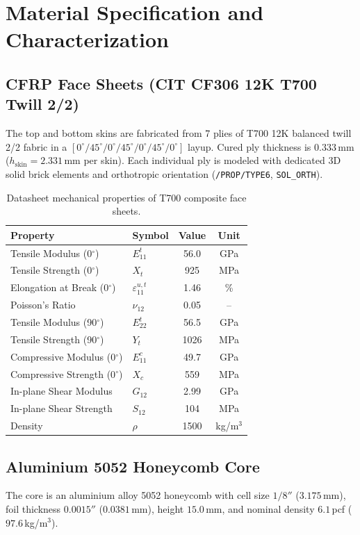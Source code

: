 \documentclass[11pt,a4paper]{article}
\begin{document}
\section{Material Specification and Characterization}
\subsection{CFRP Face Sheets (CIT CF306 12K T700 Twill 2/2)}
The top and bottom skins are fabricated from 7 plies of T700 12K balanced twill 2/2 fabric in a $[0^\circ/45^\circ/0^\circ/45^\circ/0^\circ/45^\circ/0^\circ]$ layup. Cured ply thickness is $0.333$\,mm ($h_{\text{skin}} = 2.331$\,mm per skin). Each individual ply is modeled with dedicated 3D solid brick elements and orthotropic orientation (\texttt{/PROP/TYPE6}, \texttt{SOL\_ORTH}).

\begin{table}[htbp]
\centering
\caption{Datasheet mechanical properties of T700 composite face sheets.}
\label{tab:cfrp}
\begin{tabular}{@{}llcc@{}}
\toprule
\textbf{Property} & \textbf{Symbol} & \textbf{Value} & \textbf{Unit} \\
\midrule
Tensile Modulus (0$^\circ$) & $E_{11}^t$ & 56.0 & GPa \\
Tensile Strength (0$^\circ$) & $X_t$ & 925 & MPa \\
Elongation at Break (0$^\circ$) & $\varepsilon_{11}^{u,t}$ & 1.46 & \% \\
Poisson's Ratio & $\nu_{12}$ & 0.05 & -- \\
Tensile Modulus (90$^\circ$) & $E_{22}^t$ & 56.5 & GPa \\
Tensile Strength (90$^\circ$) & $Y_t$ & 1026 & MPa \\
Compressive Modulus (0$^\circ$) & $E_{11}^c$ & 49.7 & GPa \\
Compressive Strength (0$^\circ$) & $X_c$ & 559 & MPa \\
In-plane Shear Modulus & $G_{12}$ & 2.99 & GPa \\
In-plane Shear Strength & $S_{12}$ & 104 & MPa \\
Density & $\rho$ & 1500 & kg/m$^3$ \\
\bottomrule
\end{tabular}
\end{table}

\subsection{Aluminium 5052 Honeycomb Core}
The core is an aluminium alloy 5052 honeycomb with cell size $1/8''$ ($3.175$\,mm), foil thickness $0.0015''$ ($0.0381$\,mm), height $15.0$\,mm, and nominal density $6.1$\,pcf ($97.6$\,kg/m$^3$).
\end{document}
